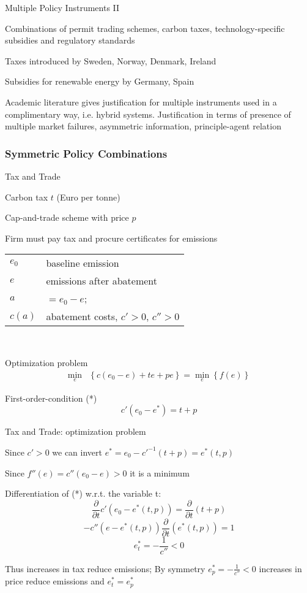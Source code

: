 {Multiple Policy Instruments II}
\item<1-> Combinations of permit trading schemes, carbon taxes, technology-specific subsidies and regulatory standards
\item<2-> Taxes introduced by Sweden, Norway, Denmark, Ireland
\item<3-> Subsidies for renewable energy by Germany, Spain
\item<4-> Academic literature gives justification for multiple instruments used in a complimentary way, i.e. hybrid systems. Justification in terms of presence of multiple market failures, asymmetric information, principle-agent relation

\subsubsection{Symmetric Policy Combinations}

{Tax and Trade}
\item <1-> Carbon tax $t$ (Euro per tonne)
\item <2-> Cap-and-trade scheme with price $p$
\item <3-> Firm must pay tax and procure certificates for emissions
\begin{tabular}{ll}
$e_0$ & baseline emission \\
$e$ & emissions after abatement \\
$a$ & $=e_0 - e$; \\
$c(a)$ & abatement costs, $c' > 0$, $c'' > 0$ \\
\end{tabular} \\
\item <4-> Optimization problem
\begin{align}
\min_{e} & \left\{c(e_0-e)+te+pe\right\} = \min_{e}\left\{f(e)\right\}
\end{align}
\item <5-> First-order-condition (*)
\[
c'(e_0-e^*)=t+p
\]


{Tax and Trade: optimization problem}
\item <1-> Since $c'>0$ we can invert $e^*=e_0-c'^{-1}(t+p)=e^*(t,p)$ \\
\item <2-> Since $f''(e)=c''(e_0-e)>0$ it is a minimum \\
\item <3-> Differentiation of (*) w.r.t. the variable t:
\[
\frac{\partial}{\partial{t}}c'(e_0-e^*(t,p))=\frac{\partial}{\partial{t}}(t+p)
\]
\[
-c''(e-e^*(t,p)) \frac{\partial}{\partial{t}} (e^*(t,p))=1
\]
\[
e^*_t=-\frac{1}{c''} < 0
\]
\item <4-> Thus increases in tax reduce emissions; By symmetry $e^*_p = -\frac{1}{c''} < 0$ increases in price reduce emissions and $e^*_t=e^*_p$

